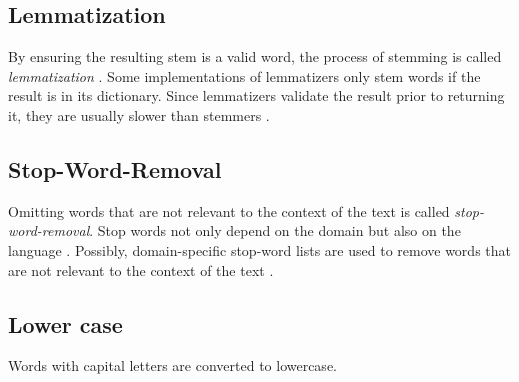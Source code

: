 \subsection{Lemmatization}\label{subsec:lemmatization}

By ensuring the resulting stem is a valid word, the process of stemming is called \textit{lemmatization} \cite{nlp-book2009}.
Some implementations of lemmatizers only stem words if the result is in its dictionary.
Since lemmatizers validate the result prior to returning it, they are usually slower than stemmers \cite{nlp-book2009}.


\subsection{Stop-Word-Removal}\label{subsec:stop-word-removal}

Omitting words that are not relevant to the context of the text is called \textit{stop-word-removal}.
Stop words not only depend on the domain but also on the language \cite{IR2011}.
Possibly, domain-specific stop-word lists are used to remove words that are not relevant to the context of the text \cite{IR2011}.



\subsection{Lower case}\label{subsec:lower-case}

Words with capital letters are converted to lowercase.